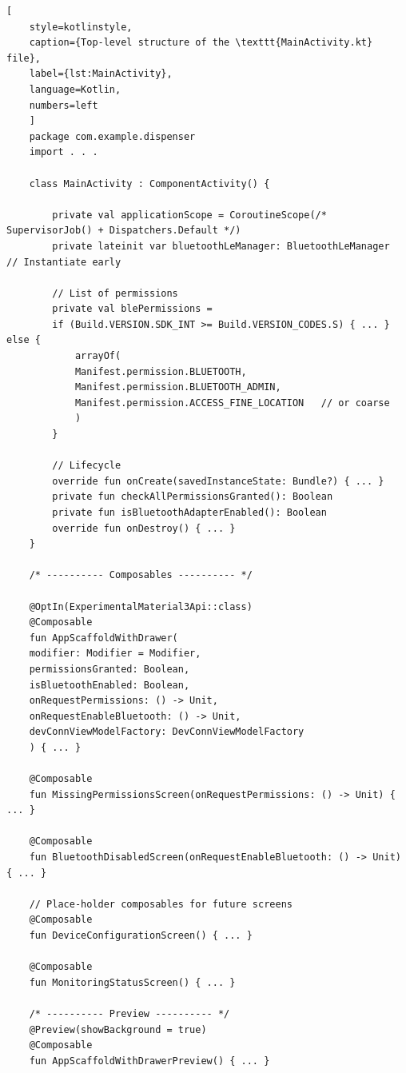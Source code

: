 \begin{lstlisting}[
	style=kotlinstyle,
	caption={Top-level structure of the \texttt{MainActivity.kt} file},
	label={lst:MainActivity},
	language=Kotlin,
	numbers=left
	]
	package com.example.dispenser
	import . . .
	
	class MainActivity : ComponentActivity() {
		
		private val applicationScope = CoroutineScope(/* SupervisorJob() + Dispatchers.Default */)
		private lateinit var bluetoothLeManager: BluetoothLeManager   // Instantiate early
		
		// List of permissions
		private val blePermissions =
		if (Build.VERSION.SDK_INT >= Build.VERSION_CODES.S) { ... } else {
			arrayOf(
			Manifest.permission.BLUETOOTH,
			Manifest.permission.BLUETOOTH_ADMIN,
			Manifest.permission.ACCESS_FINE_LOCATION   // or coarse
			)
		}
		
		// Lifecycle
		override fun onCreate(savedInstanceState: Bundle?) { ... }
		private fun checkAllPermissionsGranted(): Boolean
		private fun isBluetoothAdapterEnabled(): Boolean
		override fun onDestroy() { ... }
	}
	
	/* ---------- Composables ---------- */
	
	@OptIn(ExperimentalMaterial3Api::class)
	@Composable
	fun AppScaffoldWithDrawer(
	modifier: Modifier = Modifier,
	permissionsGranted: Boolean,
	isBluetoothEnabled: Boolean,
	onRequestPermissions: () -> Unit,
	onRequestEnableBluetooth: () -> Unit,
	devConnViewModelFactory: DevConnViewModelFactory
	) { ... }
	
	@Composable
	fun MissingPermissionsScreen(onRequestPermissions: () -> Unit) { ... }
	
	@Composable
	fun BluetoothDisabledScreen(onRequestEnableBluetooth: () -> Unit) { ... }
	
	// Place-holder composables for future screens
	@Composable
	fun DeviceConfigurationScreen() { ... }
	
	@Composable
	fun MonitoringStatusScreen() { ... }
	
	/* ---------- Preview ---------- */
	@Preview(showBackground = true)
	@Composable
	fun AppScaffoldWithDrawerPreview() { ... }
\end{lstlisting}
